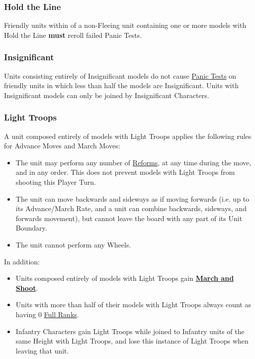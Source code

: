 \subsubsection{Hold the Line}
\idx[main=y]{\holdtheline}\label{hold_the_line}

 Friendly units within  of a non-Fleeing unit containing one or more models with Hold the Line \textbf{must} reroll failed Panic Tests.

\subsubsection{Insignificant}
\idx[main=y]{\insignificant}\label{insignificant}

Units consisting entirely of Insignificant models do not cause \hyperref[panic_test]{Panic Tests} on friendly units in which less than half the models  are Insignificant. Units with Insignificant \rnf{} models can only be joined by Insignificant Characters.

\subsubsection{Light Troops}
\idx[main=y]{\lighttroops}\label{light_troops}

A unit composed entirely of models with Light Troops applies the following rules for Advance Moves and March Moves:

\begin{itemize}
	\item The unit may perform any number of \hyperref[reform]{Reforms}, at any time during the move, and in any order. This does not prevent models with Light Troops from shooting this Player Turn.
	\item The unit can move backwards and sideways as if moving forwards (i.e. up to its Advance/March Rate, and a unit can combine backwards, sideways, and forwards movement), but cannot leave the board with any part of its Unit Boundary.
	\item The unit cannot perform any Wheels.
\end{itemize}

In addition:
\begin{itemize}
	\item Units composed entirely of models with Light Troops gain \hyperref[march_and_shoot]{\textbf{March and Shoot}}.
	\item Units with more than half of their models with Light Troops always count as having 0 \hyperref[full_ranks]{Full Ranks}.
	\item Infantry Characters gain Light Troops while joined to Infantry units of the same Height with Light Troops, and lose this instance of Light Troops when leaving that unit.
\end{itemize}

